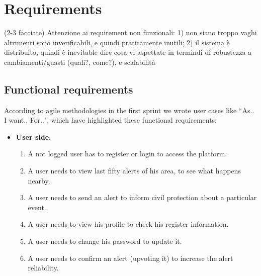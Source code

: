 \documentclass[a4paper,12pt]{report}
\begin{document}

\chapter{Requirements}
(2-3 facciate)
Attenzione ai requirement non funzionali: 1) non siano troppo vaghi altrimenti sono inverificabili, e quindi praticamente inutili; 2) il sistema è distribuito, quindi è inevitable dire cosa vi aspettate in termindi di robustezza a cambiamenti/guasti (quali?, come?), e scalabilità

\section{Functional requirements}

According to agile methodologies in the first sprint we wrote user cases like ``As.. I want.. For..", which have highlighted these functional requirements:

\begin{itemize}
\item \textbf{User side}:
\begin{enumerate}
\item A not logged user has to register or login to access the platform.
\item A user needs to view last fifty alerts of his area, to see what happens nearby.
\item A user needs to send an alert to inform civil protection about a particular event.
\item A user needs to view his profile to check his register information.
\item A user needs to change his password to update it.
\item A user needs to confirm an alert (upvoting it) to increase the alert reliability.
\end{enumerate}
\end{itemize}
\end{document}
